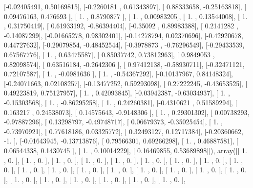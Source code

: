 \documentclass{article}
\begin{document}
       [-0.02405491,  0.50169815],
       [-0.2260181 ,  0.61343897],
       [ 0.88333658, -0.25163818],
       [ 0.09476163,  0.476693  ],
       [ 1.        ,  0.8790877 ],
       [ 1.        ,  0.00983205],
       [ 1.        ,  0.13544008],
       [ 1.        ,  0.31750419],
       [ 0.61933192, -0.86394404],
       [-0.35092   ,  0.89983388],
       [ 0.2141282 , -0.14087299],
       [-0.01665278,  0.98302401],
       [-0.14278794,  0.02370696],
       [-0.42920678,  0.44727632],
       [-0.29079854, -0.48452544],
       [-0.3978873 , -0.76296549],
       [-0.29433539,  0.67567776],
       [ 1.        ,  0.63475587],
       [ 0.85037742,  0.73812963],
       [ 0.9849053 ,  0.82098574],
       [ 0.63516184, -0.2642306 ],
       [ 0.97412138, -0.58930711],
       [-0.32471121,  0.72107587],
       [ 1.        , -0.0981636 ],
       [ 1.        , -0.54367292],
       [-0.10137967,  0.84148324],
       [-0.24071663,  0.02108257],
       [-0.13477252,  0.59293098],
       [ 0.27222245, -0.43653525],
       [ 0.49223819,  0.75127957],
       [ 1.        ,  0.42093845],
       [-0.03942387, -0.63034937],
       [ 1.        , -0.15303568],
       [ 1.        , -0.86295258],
       [ 1.        ,  0.24260381],
       [-0.4310621 ,  0.51589294],
       [ 0.163217  ,  0.24538073],
       [ 0.14575643, -0.9148306 ],
       [ 1.        ,  0.29301302],
       [ 0.00738293, -0.97887296],
       [ 0.13298797, -0.49748717],
       [ 0.06679373, -0.35025454],
       [ 1.        , -0.73970921],
       [ 0.77618186,  0.03325772],
       [ 0.32493127,  0.12717384],
       [-0.20360662, -1.        ],
       [-0.01643945, -0.13713876],
       [ 0.79566301,  0.69266298],
       [ 1.        ,  0.46887581],
       [ 0.06544338,  0.1430745 ],
       [ 1.        ,  0.10014229],
       [ 0.16469855,  0.53689898]]), array([[ 1.        ,  0.        ],
       [ 1.        ,  0.        ],
       [ 1.        ,  0.        ],
       [ 1.        ,  0.        ],
       [ 1.        ,  0.        ],
       [ 1.        ,  0.        ],
       [ 1.        ,  0.        ],
       [ 1.        ,  0.        ],
       [ 1.        ,  0.        ],
       [ 1.        ,  0.        ],
       [ 1.        ,  0.        ],
       [ 1.        ,  0.        ],
       [ 1.        ,  0.        ],
       [ 1.        ,  0.        ],
       [ 1.        ,  0.        ],
       [ 1.        ,  0.        ],
       [ 1.        ,  0.        ],
       [ 1.        ,  0.        ],
       [ 1.        ,  0.        ],
       [ 1.        ,  0.        ],
       [ 1.        ,  0.        ],
       [ 1.        ,  0.        ],
       [ 1.        ,  0.        ],
\end{document}
